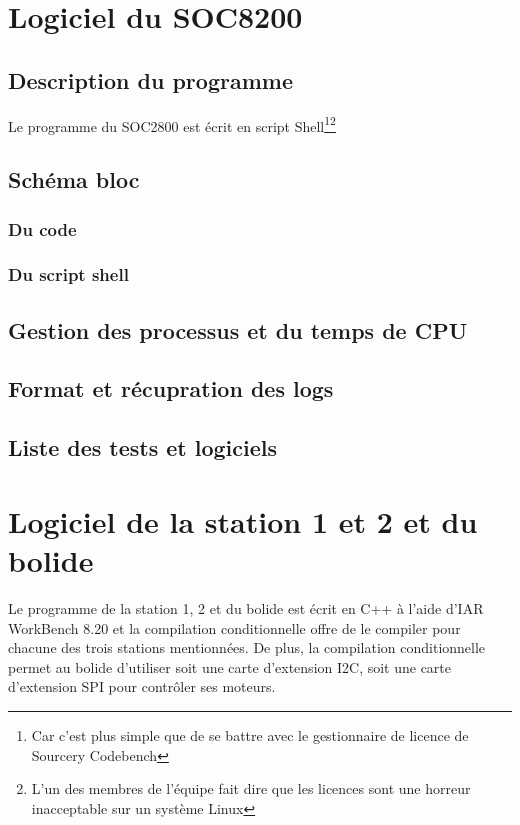 \documentclass[10pt,a4paper,final]{article}
\begin{document}
\begin{spacing}{1.5}
\pagebreak
\section{Logiciel du SOC8200}
\subsection{Description du programme}
Le programme du SOC2800 est écrit en script Shell\footnote{Car c'est plus simple que de se battre avec le gestionnaire de licence de Sourcery Codebench}\footnote{L'un des membres de l'équipe fait dire que les licences sont une horreur inacceptable sur un système Linux}

\subsection{Schéma bloc}
\subsubsection{Du code}

\subsubsection{Du script shell}

\subsection{Gestion des processus et du temps de CPU}

\subsection{Format et récupration des logs}

\subsection{Liste des tests et logiciels}






\pagebreak
\section{Logiciel de la station 1 et 2 et du bolide}
Le programme de la station 1, 2 et du bolide est écrit en C++ à l'aide d'IAR WorkBench 8.20 et la compilation conditionnelle offre de le compiler pour chacune des trois stations mentionnées. De plus, la compilation conditionnelle permet au bolide d'utiliser soit une carte d'extension I2C, soit une carte d'extension SPI pour contrôler ses moteurs.


\end{spacing}
\end{document}
